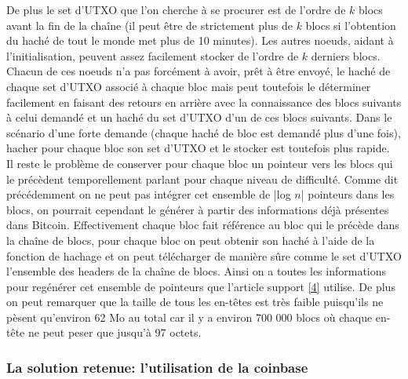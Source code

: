 \documentclass[12pt,a4paper]{article}
\newcommand{\source}[1]{\hyperlink{#1}{[#1]}}
\begin{document}
De plus le set d'UTXO que l'on cherche à se procurer est de l'ordre de $k$ blocs avant la fin de la chaîne (il peut être de strictement plus de $k$ blocs si l'obtention du haché de tout le monde met plus de 10 minutes). Les autres noeuds, aidant à l'initialisation, peuvent assez facilement stocker de l'ordre de $k$ derniers blocs. Chacun de ces noeuds n'a pas forcément à avoir, prêt à être envoyé, le haché de chaque set d'UTXO associé à chaque bloc mais peut toutefois le déterminer facilement en faisant des retours en arrière avec la connaissance des blocs suivants à celui demandé et un haché du set d'UTXO d'un de ces blocs suivants. Dans le scénario d'une forte demande (chaque haché de bloc est demandé plus d'une fois), hacher pour chaque bloc son set d'UTXO et le stocker est toutefois plus rapide.\\ %

Il reste le problème de conserver pour chaque bloc un pointeur vers les blocs qui le précèdent temporellement parlant pour chaque niveau de difficulté. Comme dit précédemment on ne peut pas intégrer cet ensemble de |log $n$| pointeurs dans les blocs, on pourrait cependant le générer à partir des informations déjà présentes dans Bitcoin. Effectivement chaque bloc fait référence au bloc qui le précède dans la chaîne de blocs, pour chaque bloc on peut obtenir son haché à l'aide de la fonction de hachage et on peut télécharger de manière sûre comme le set d'UTXO l'ensemble des headers de la chaîne de blocs. Ainsi on a toutes les informations pour regénérer cet ensemble de pointeurs que l'article support \source{4} utilise. De plus on peut remarquer que la taille de tous les en-têtes est très faible puisqu'ils ne pèsent qu'environ 62 Mo au total car il y a environ 700 000 blocs où chaque en-tête ne peut peser que jusqu'à 97 octets.\\ %

	\subsubsection{La solution retenue: l'utilisation de la coinbase} %
\end{document}
